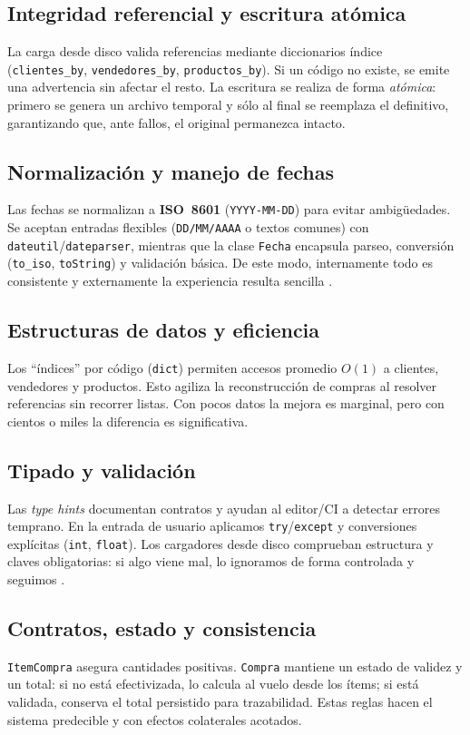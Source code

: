 \documentclass[11pt]{article}
\begin{document}
\subsection{Integridad referencial y escritura atómica}
La carga desde disco valida referencias mediante diccionarios índice (\texttt{clientes\_by}, \texttt{vendedores\_by}, \texttt{productos\_by}). Si un código no existe, se emite una advertencia sin afectar el resto. La escritura se realiza de forma \emph{atómica}: primero se genera un archivo temporal y sólo al final se reemplaza el definitivo, garantizando que, ante fallos, el original permanezca intacto.

\subsection{Normalización y manejo de fechas}
Las fechas se normalizan a \textbf{ISO~8601} (\texttt{YYYY-MM-DD}) para evitar ambigüedades. Se aceptan entradas flexibles (\texttt{DD/MM/AAAA} o textos comunes) con \texttt{dateutil}/\texttt{dateparser}, mientras que la clase \texttt{Fecha} encapsula parseo, conversión (\texttt{to\_iso}, \texttt{toString}) y validación básica. De este modo, internamente todo es consistente y externamente la experiencia resulta sencilla \cite{python_docs}.


\subsection{Estructuras de datos y eficiencia}
Los “índices” por código (\texttt{dict}) permiten accesos promedio \(O(1)\) a clientes, vendedores y productos. Esto agiliza la reconstrucción de compras al resolver referencias sin recorrer listas. Con pocos datos la mejora es marginal, pero con cientos o miles la diferencia es significativa.


\subsection{Tipado y validación}
Las \emph{type hints} documentan contratos y ayudan al editor/CI a detectar errores temprano. En la entrada de usuario aplicamos \texttt{try}/\texttt{except} y conversiones explícitas (\texttt{int}, \texttt{float}). Los cargadores desde disco comprueban estructura y claves obligatorias: si algo viene mal, lo ignoramos de forma controlada y seguimos \cite{lutz2013,guttag2016}.

\subsection{Contratos, estado y consistencia}
\texttt{ItemCompra} asegura cantidades positivas. \texttt{Compra} mantiene un estado de validez y un total: si no está efectivizada, lo calcula al vuelo desde los ítems; si está validada, conserva el total persistido para trazabilidad. Estas reglas hacen el sistema predecible y con efectos colaterales acotados.
\end{document}
